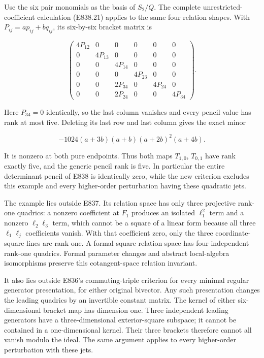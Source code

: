 Use the six pair monomials as the basis of \(S_2/Q\). The complete
unrestricted-coefficient calculation (E838.21) applies to the same four
relation shapes. With \(P_{ij}=ap_{ij}+bq_{ij}\), its six-by-six bracket
matrix is

\[
 \begin{pmatrix}
 4P_{12}&0&0&0&0&0\\
 0&4P_{13}&0&0&0&0\\
 0&0&4P_{14}&0&0&0\\
 0&0&0&4P_{23}&0&0\\
 0&0&2P_{34}&0&4P_{24}&0\\
 0&0&2P_{24}&0&0&4P_{34}
 \end{pmatrix}.
 \tag{E839.13}
\]

Here \(P_{34}=0\) identically, so the last column vanishes and every
pencil value has rank at most five. Deleting its last row and last
column gives the exact minor

\[
 -1024(a+3b)(a+b)(a+2b)^2(a+4b).
 \tag{E839.14}
\]

It is nonzero at both pure endpoints. Thus both maps \(T_{1,0}\),
\(T_{0,1}\) have rank exactly five, and the generic pencil rank is five.
In particular the entire determinant pencil of E838 is identically zero,
while the new criterion excludes this example and every higher-order
perturbation having these quadratic jets.

The example lies outside E837. Its relation space has only three
projective rank-one quadrics: a nonzero coefficient at \(F_1\) produces
an isolated \(\ell_1^2\) term and a nonzero \(\ell_2\ell_3\) term, which
cannot be a square of a linear form because all three \(\ell_1\ell_j\)
coefficients vanish. With that coefficient zero, only the three
coordinate-square lines are rank one. A formal square relation space has
four independent rank-one quadrics. Formal parameter changes and
abstract local-algebra isomorphisms preserve this cotangent-space
relation invariant.

It also lies outside E836's commuting-triple criterion for every minimal
regular generator presentation, for either original bivector. Any such
presentation changes the leading quadrics by an invertible constant
matrix. The kernel of either six-dimensional bracket map has dimension
one. Three independent leading generators have a three-dimensional
exterior-square subspace; it cannot be contained in a one-dimensional
kernel. Their three brackets therefore cannot all vanish modulo the
ideal. The same argument applies to every higher-order perturbation with
these jets.

